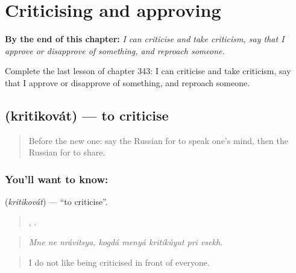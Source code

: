 
\chapter{Criticising and approving}
\label{ch:ru-criticising-and-approving}

\begin{chapteropening}
\textbf{By the end of this chapter:} \emph{I can criticise and take criticism, say that I approve or disapprove of something, and reproach someone.}

Complete the last lesson of chapter 343: I can criticise and take criticism, say that I approve or disapprove of something, and reproach someone.
\end{chapteropening}

\section[\texorpdfstring{\ru{критиковать} (kritikovát)}{критиковать (kritikovát)}]{ (kritikovát) — to criticise}

\label{lesson:RU-C343-kritikovat}



\begin{quote}
Before the new one: say the Russian for to speak one’s mind, then the Russian for to share.
\end{quote}

\subsection*{You'll want to know: }
\textbf{} (\emph{kritikovát}) — \textquotedblleft{}to criticise\textquotedblright{}.

\begin{quote}
  ,     .
\end{quote}

\begin{quote}
\emph{Mne ne nrávitsya, kogdá menyá kritikúyut pri vsekh.}
\end{quote}

\begin{quote}
I do not like being criticised in front of everyone.
\end{quote}

